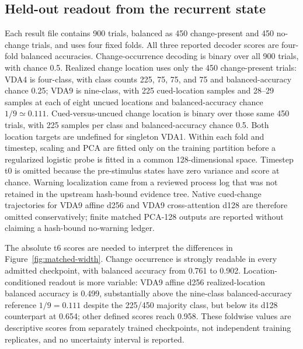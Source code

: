 \documentclass[11pt,a4paper]{article}
\begin{document}
\subsection{Held-out readout from the recurrent state}
Each result file contains 900 trials, balanced as 450 change-present and 450 no-change trials, and uses four fixed folds. All three reported decoder scores are four-fold balanced accuracies. Change-occurrence decoding is binary over all 900 trials, with chance 0.5. Realized change location uses only the 450 change-present trials: VDA4 is four-class, with class counts 225, 75, 75, and 75 and balanced-accuracy chance 0.25; VDA9 is nine-class, with 225 cued-location samples and 28--29 samples at each of eight uncued locations and balanced-accuracy chance $1/9\simeq0.111$. Cued-versus-uncued change location is binary over those same 450 trials, with 225 samples per class and balanced-accuracy chance 0.5. Both location targets are undefined for singleton VDA1. Within each fold and timestep, scaling and PCA are fitted only on the training partition before a regularized logistic probe is fitted in a common 128-dimensional space. Timestep t0 is omitted because the pre-stimulus states have zero variance and score at chance. Warning localization came from a reviewed process log that was not retained in the upstream hash-bound evidence tree. Native cued-change trajectories for VDA9 affine d256 and VDA9 cross-attention d128 are therefore omitted conservatively; finite matched PCA-128 outputs are reported without claiming a hash-bound no-warning ledger.

The absolute t6 scores are needed to interpret the differences in Figure~\ref{fig:matched-width}. Change occurrence is strongly readable in every admitted checkpoint, with balanced accuracy from 0.761 to 0.902. Location-conditioned readout is more variable: VDA9 affine d256 realized-location balanced accuracy is 0.499, substantially above the nine-class balanced-accuracy reference $1/9=0.111$ despite the 225/450 majority class, but below its d128 counterpart at 0.654; other defined scores reach 0.958. These foldwise values are descriptive scores from separately trained checkpoints, not independent training replicates, and no uncertainty interval is reported.
\end{document}
